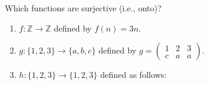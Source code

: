 \documentclass[11pt, compress]{beamer}
\newcommand{\amp}{&}
\newcommand{\Z}{\mathbb Z}
\begin{document}
\begin{frame}
\frametitle{}
\begin{example}[0.4.6]Which functions are surjective (i.e., onto)?\begin{enumerate}
\item{} \(f:\Z \to \Z\) defined by \(f(n) = 3n\).

\item{} \(g: \{1,2,3\} \to \{a,b,c\}\) defined by \(g = \begin{pmatrix}1 \amp 2 \amp 3 \\ c \amp a \amp a \end{pmatrix}\).

\item{} \(h:\{1,2,3\} \to \{1,2,3\}\) defined as follows:
\begin{sidebyside}{1}{0.4}{0.4}{0}%
\begin{sbspanel}{0.2}%
%
\end{sbspanel}%
\end{sidebyside}%

\end{enumerate}

\end{example}
\end{frame}
 
\end{document}
